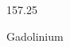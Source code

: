 \documentclass[12pt]{article}
\begin{document}
\hfill{}
\vfill
\begin{center}
  {\fontsize{50}{60}
  }

  157.25

Gadolinium
\end{center}
\vfill
\end{document}
